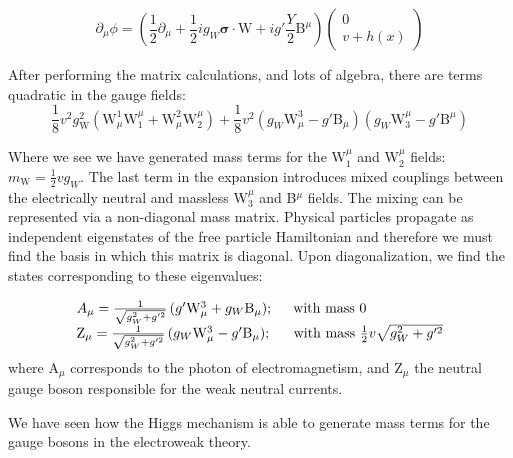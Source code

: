 \begin{equation}
\partial_{\mu}\phi = (\frac{1}{2}\partial_{\mu} + \frac{1}{2} i g_{W}\bm{\sigma}\cdot\bm{\mathrm{W}} + i g' \frac{Y}{2} \mathrm{B}^{\mu})\begin{pmatrix} 0 \\ v + h(x) \end{pmatrix}
\end{equation}

After performing the matrix calculations, and lots of algebra, there are terms quadratic in the gauge fields:
\begin{equation}
\frac{1}{8} v^{2} g_{\mathrm{W}}^{2} ( \mathrm{W}^{1}_{\mu} \mathrm{W}_{1}^{\mu} + \mathrm{W}^{2}_{\mu} \mathrm{W}_{2}^{\mu}) + \frac{1}{8} v^{2} ( g_{W} \mathrm{W}^{3}_{\mu} - g'\mathrm{B}_{\mu} ) ( g_{W} \mathrm{W}_{3}^{\mu} -g' \mathrm{B}^{\mu} )
\end{equation}

Where we see we have generated mass terms for the W$^{\mu}_{1}$ and W$^{\mu}_{2}$ fields:  $m_{\mathrm{W}} = \frac{1}{2} v g_{W}$. The last term in the expansion introduces mixed couplings between the electrically neutral and massless W$_{3}^{\mu}$ and B$^{\mu}$ fields. The mixing can be represented via a non-diagonal mass matrix. Physical particles propagate as independent eigenstates of the free particle Hamiltonian and therefore we must find the basis in which this matrix is diagonal. Upon diagonalization, we find the states corresponding to these eigenvalues:

\begin{equation}
\begin{array}{l}
A_{\mu} = \frac{1}{\sqrt{g_{W}^{2} + g'^{2}}} \, (g' \mathrm{W}^{3}_{\mu} + g_{W}\mathrm{B}_{\mu});\hspace{0.5cm} \mathrm{with\,\,mass}\,\,0\\
\mathrm{Z}_{\mu} = \frac{1}{\sqrt{g_{W}^{2} + g'^{2}}} \, (g_{W} \mathrm{W}^{3}_{\mu} - g'\mathrm{B}_{\mu}); \hspace{0.56cm} \mathrm{with\,\,mass}\,\, \frac{1}{2}v\sqrt{g_{W}^{2} + g'^{2}}
\end{array}
\end{equation}
where $\mathrm{A}_{\mu}$ corresponds to the photon of electromagnetism, and Z$_{\mu}$ the neutral gauge boson responsible for the weak neutral currents.

We have seen how the Higgs mechanism is able to generate mass terms for the gauge bosons in the electroweak theory.

